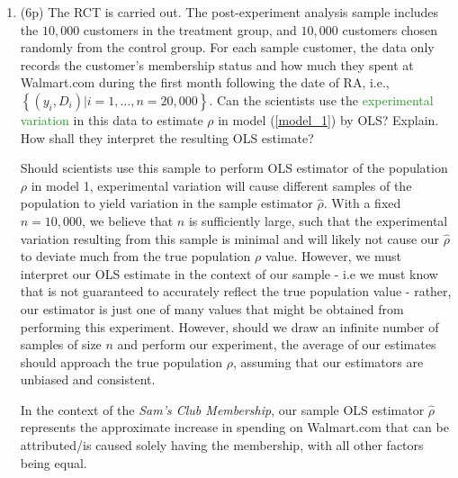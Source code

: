 \documentclass{article}
\newcommand{\gap}{\vspace{1 em}}
\begin{document}
\begin{enumerate}[label=\textbf{Q\arabic{enumi}}.,ref=Q\arabic{enumi}, wide=0pt, itemsep=1em, topsep=5pt]
\begin{enumerate}
\begin{solution}
{            }
        \end{solution}

        \item (6p) The RCT is carried out. The post-experiment analysis sample includes the $10,000$ customers in the treatment group, and $10,000$ customers chosen randomly from the control group. For each sample customer, the data only records the customer's membership status and how much they spent at Walmart.com during the first month following the date of RA, i.e., $\left\{ \left( y_{i},D_{i}\right) |i=1,\ldots,n=20,000\right\} $. Can the scientists use the \textcolor{ForestGreen}{experimental variation} in this data to estimate $\rho$ in model (\ref{model_1}) by OLS? Explain. How shall they interpret the resulting OLS estimate?
        \begin{solution}
            {
                Should scientists use this sample to perform OLS estimator of the population $\rho$ in model 1, experimental variation will cause different samples of the population to yield variation in the sample estimator $\hat{\rho}$. With a fixed $n = 10,000$, we believe that $n$ is sufficiently large, such that the experimental variation resulting from this sample is minimal and will likely not cause our $\hat{\rho}$ to deviate much from the true population $\rho$ value. However, we must interpret our OLS estimate in the context of our sample - i.e we must know that is not guaranteed to accurately reflect the true population value - rather, our estimator is just one of many values that might be obtained from performing this experiment. However, should we draw an infinite number of samples of size $n$ and perform our experiment, the average of our estimates should approach the true population $\rho$, assuming that our estimators are unbiased and consistent.\gap

                In the context of the \textit{Sam's Club Membership}, our sample OLS estimator $\hat{\rho}$ represents the approximate increase in spending on Walmart.com that can be attributed/is caused solely having the membership, with all other factors being equal.
             }
        \end{solution}
    \end{enumerate}



\end{enumerate}
\end{document}
